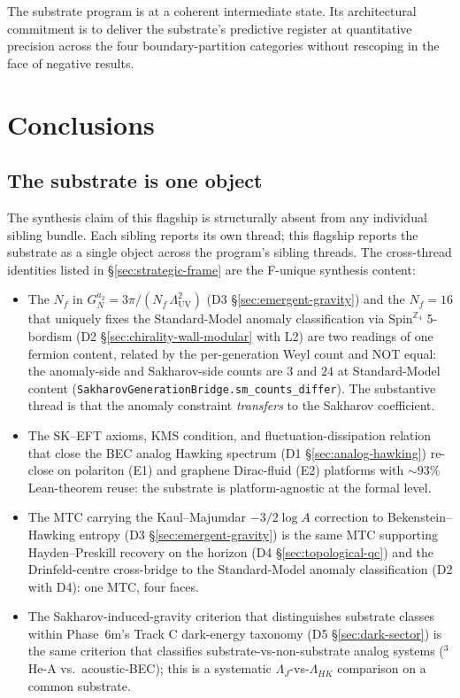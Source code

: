 \documentclass[aps,prd,reprint,nofootinbib,superscriptaddress]{revtex4-2}
\begin{document}
The substrate program is at a coherent intermediate state. Its
architectural commitment is to deliver the substrate's predictive
register at quantitative precision across the four boundary-partition
categories without rescoping in the face of negative results.

\section{Conclusions}
\label{sec:conclusions}

\subsection{The substrate is one object}

The synthesis claim of this flagship is structurally absent from any
individual sibling bundle. Each sibling reports its own thread; this
flagship reports the substrate as a single object across the
program's sibling threads.
The cross-thread identities listed in \S\ref{sec:strategic-frame} are
the F-unique synthesis content:

\begin{itemize}
\item The $N_f$ in
  $G_N^{a_2} = 3\pi/(N_f\,\Lambda_{\mathrm{UV}}^{2})$
  (D3 \S\ref{sec:emergent-gravity}) and the $N_f = 16$ that uniquely
  fixes the Standard-Model anomaly classification via
  $\mathrm{Spin}^{\mathbb{Z}_4}$ 5-bordism (D2
  \S\ref{sec:chirality-wall-modular} with L2) are two readings of one
  fermion content, related by the per-generation Weyl count and NOT
  equal: the anomaly-side and Sakharov-side counts are $3$ and $24$
  at Standard-Model content
  (\texttt{SakharovGenerationBridge.sm\_counts\_differ}). The
  substantive thread is that the anomaly constraint \emph{transfers} to
  the Sakharov coefficient.
\item The SK--EFT axioms, KMS condition, and fluctuation-dissipation
  relation that close the BEC analog Hawking spectrum (D1
  \S\ref{sec:analog-hawking}) re-close on polariton (E1) and
  graphene Dirac-fluid (E2) platforms with $\sim 93\%$ Lean-theorem
  reuse: the substrate is platform-agnostic at the formal level.
\item The MTC carrying the Kaul--Majumdar $-3/2 \log A$ correction to
  Bekenstein--Hawking entropy (D3 \S\ref{sec:emergent-gravity}) is
  the same MTC supporting Hayden--Preskill recovery on the horizon
  (D4 \S\ref{sec:topological-qc}) and the Drinfeld-centre cross-bridge
  to the Standard-Model anomaly classification (D2 with D4): one MTC,
  four faces.
\item The Sakharov-induced-gravity criterion that distinguishes
  substrate classes within Phase~6m's Track C dark-energy taxonomy (D5
  \S\ref{sec:dark-sector}) is the same criterion that classifies
  substrate-vs-non-substrate analog systems
  ($^3$He-A vs.\ acoustic-BEC); this is a systematic
  $\Lambda_J$-vs-$\Lambda_{HK}$ comparison on a common substrate.
\end{itemize}
\end{document}
